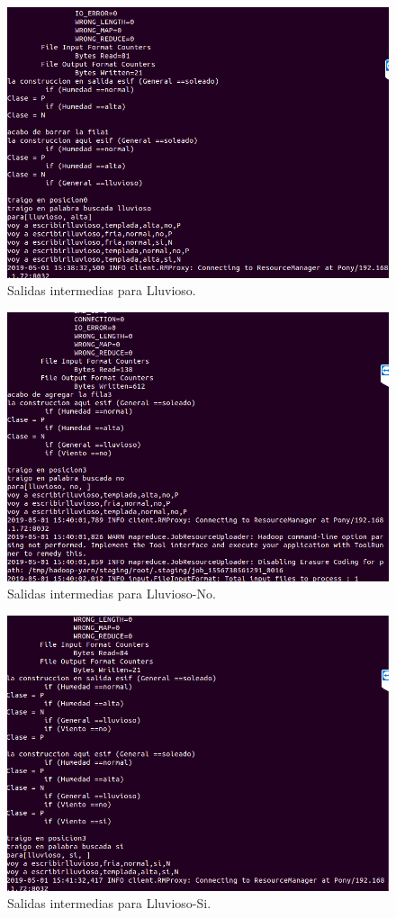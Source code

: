 \begin{figure}[H]
	\begin{center}
		\hypertarget{fig:ID37}{\hspace{1pt}}
		\includegraphics[width=.7\textwidth]{capitulo4a/images/ID3_9.png}
		\caption{Salidas intermedias para Lluvioso.}
		\label{fig:ID37}
	\end{center}
\end{figure}
\begin{figure}[H]
	\begin{center}
		\hypertarget{fig:ID38}{\hspace{1pt}}
		\includegraphics[width=.7\textwidth]{capitulo4a/images/ID3_10.png}
		\caption{Salidas intermedias para Lluvioso-No.}
		\label{fig:ID38}
	\end{center}
\end{figure}
\begin{figure}[H]
	\begin{center}
		\hypertarget{fig:ID39}{\hspace{1pt}}
		\includegraphics[width=.7\textwidth]{capitulo4a/images/ID3_12.png}
		\caption{Salidas intermedias para Lluvioso-Si.}
		\label{fig:ID39}
	\end{center}
\end{figure}
